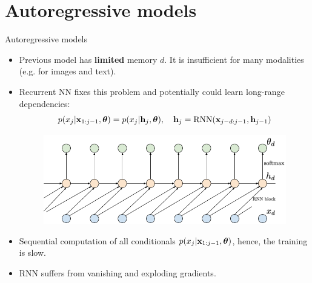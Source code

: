 \section{Autoregressive models}
\begin{frame}{Autoregressive models}
	\begin{itemize}
		\item Previous model has \textbf{limited} memory $d$. It is insufficient for many modalities (e.g. for images and text). 
		\item Recurrent NN fixes this problem and potentially could learn long-range dependencies:
		\[
			p(x_j | \mathbf{x}_{1:j - 1}, \boldsymbol{\theta}) = p(x_j | \mathbf{h}_j, \boldsymbol{\theta}), \quad \mathbf{h}_j = \text{RNN}(\mathbf{x}_{j-d:j - 1}, \mathbf{h}_{j - 1})
		\]
		 \begin{figure}
	    \centering
	    \includegraphics[width=0.7\linewidth]{figs/sequential_RNN}
		 \end{figure}
		\item Sequential computation of all conditionals $p(x_j | \mathbf{x}_{1:j-1}, \boldsymbol{\theta})$, hence, the training is slow.
		\item RNN suffers from vanishing and exploding gradients.
	\end{itemize}
\end{frame}
